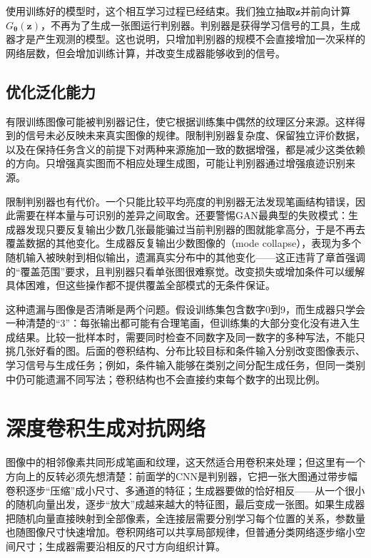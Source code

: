 使用训练好的模型时，这个相互学习过程已经结束。我们独立抽取$\bm{z}$并前向计算$G_{\bm{\theta}}(\bm{z})$，不再为了生成一张图运行判别器。判别器是获得学习信号的工具，生成器才是产生观测的模型。这也说明，只增加判别器的规模不会直接增加一次采样的网络层数，但会增加训练计算，并改变生成器能够收到的信号。

\subsection{优化泛化能力}
\label{sec:neural-generative-gan-generalization-extension}

有限训练图像可能被判别器记住，使它根据训练集中偶然的纹理区分来源。这样得到的信号未必反映未来真实图像的规律。限制判别器复杂度、保留独立评价数据，以及在保持任务含义的前提下对两种来源施加一致的数据增强，都是减少这类依赖的方向。只增强真实图而不相应处理生成图，可能让判别器通过增强痕迹识别来源。

限制判别器也有代价。一个只能比较平均亮度的判别器无法发现笔画结构错误，因此需要在样本量与可识别的差异之间取舍。还要警惕GAN最典型的失败模式：生成器发现只要反复输出少数几张最能骗过当前判别器的图就能拿高分，于是不再去覆盖数据的其他变化。生成器反复输出少数图像的（mode collapse），表现为多个随机输入被映射到相似输出，遗漏真实分布中的其他变化——这正违背了章首强调的“覆盖范围”要求，且判别器只看单张图很难察觉。改变损失或增加条件可以缓解具体困难，但这些操作都不提供覆盖全部模式的无条件保证。

这种遗漏与图像是否清晰是两个问题。假设训练集包含数字0到9，而生成器只学会一种清楚的“3”：每张输出都可能有合理笔画，但训练集的大部分变化没有进入生成结果。比较一批样本时，需要同时检查不同数字及同一数字的多种写法，不能只挑几张好看的图。后面的卷积结构、分布比较目标和条件输入分别改变图像表示、学习信号与生成任务；例如，条件输入能够在类别之间分配生成任务，但同一类别中仍可能遗漏不同写法；卷积结构也不会直接约束每个数字的出现比例。

\section{深度卷积生成对抗网络}
\label{sec:neural-generative-dcgan}

图像中的相邻像素共同形成笔画和纹理，这天然适合用卷积来处理；但这里有一个方向上的反转必须先想清楚：前面学的CNN是判别器，它把一张大图通过带步幅卷积逐步“压缩”成小尺寸、多通道的特征；生成器要做的恰好相反——从一个很小的随机向量出发，逐步“放大”成越来越大的特征图，最后变成一张图。如果生成器把随机向量直接映射到全部像素，全连接层需要分别学习每个位置的关系，参数量也随图像尺寸快速增加。卷积网络可以共享局部规律，但普通分类网络逐步缩小空间尺寸；生成器需要沿相反的尺寸方向组织计算。

